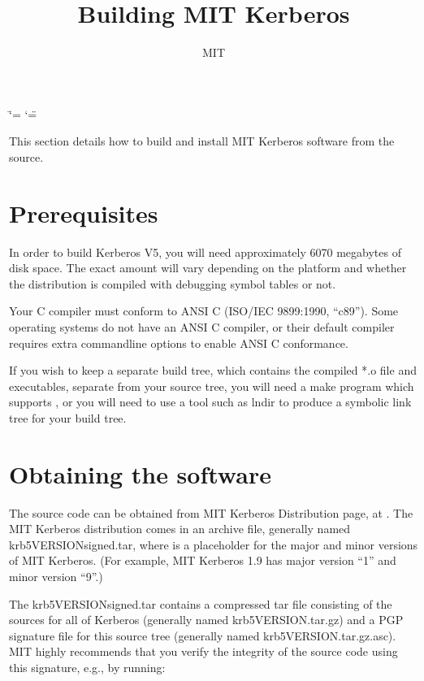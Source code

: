 \documentclass[letterpaper,10pt,english]{sphinxmanual}
\title{Building MIT Kerberos}
\date{ }
\author{MIT}
\begin{document}
\ifdefined\shorthandoff
  \ifnum\catcode`\=\string=\active\shorthandoff{=}\fi
  \ifnum\catcode`\"=\active{}\fi
\fi

\pagestyle{empty}
\sphinxmaketitle
\pagestyle{plain}
\sphinxtableofcontents
\pagestyle{normal}
\label{\detokenize{build/index::doc}}


\sphinxAtStartPar
This section details how to build and install MIT Kerberos software
from the source.


\chapter{Prerequisites}
\label{\detokenize{build/index:prerequisites}}
\sphinxAtStartPar
In order to build Kerberos V5, you will need approximately 60\sphinxhyphen{}70
megabytes of disk space.  The exact amount will vary depending on the
platform and whether the distribution is compiled with debugging
symbol tables or not.

\sphinxAtStartPar
Your C compiler must conform to ANSI C (ISO/IEC 9899:1990, “c89”).
Some operating systems do not have an ANSI C compiler, or their
default compiler requires extra command\sphinxhyphen{}line options to enable ANSI C
conformance.

\sphinxAtStartPar
If you wish to keep a separate build tree, which contains the compiled
*.o file and executables, separate from your source tree, you will
need a make program which supports , or you will need to use
a tool such as lndir to produce a symbolic link tree for your build
tree.


\chapter{Obtaining the software}
\label{\detokenize{build/index:obtaining-the-software}}
\sphinxAtStartPar
The source code can be obtained from MIT Kerberos Distribution page,
at .
The MIT Kerberos distribution comes in an archive file, generally
named krb5\sphinxhyphen{}VERSION\sphinxhyphen{}signed.tar, where  is a placeholder for
the major and minor versions of MIT Kerberos.  (For example, MIT
Kerberos 1.9 has major version “1” and minor version “9”.)

\sphinxAtStartPar
The krb5\sphinxhyphen{}VERSION\sphinxhyphen{}signed.tar contains a compressed tar file consisting
of the sources for all of Kerberos (generally named
krb5\sphinxhyphen{}VERSION.tar.gz) and a PGP signature file for this source tree
(generally named krb5\sphinxhyphen{}VERSION.tar.gz.asc).  MIT highly recommends that
you verify the integrity of the source code using this signature,
e.g., by running:
\end{document}
